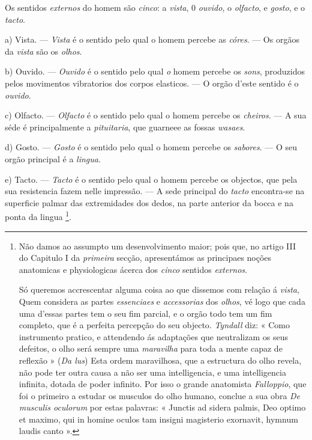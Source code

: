  
Os sentidos \emph{externos} do homem são \emph{cinco}: a \emph{vista}, 0 \emph{ouvido}, o \emph{olfacto}, e \emph{gosto}, e o \emph{tacto}.

a) Vista. --- \emph{Vista} é o sentido pelo qual o homem percebe as \emph{córes}. --- Os orgãos da \emph{vista} são os \emph{olhos}.

b) Ouvido. --- \emph{Ouvido} é o sentido pelo qual \emph{o} homem percebe os \emph{sons}, produzidos pelos movimentos vibratorios dos corpos elasticos. --- O orgão d'este sentido é o \emph{ouvido}.

c) Olfacto. --- \emph{Olfacto} é o sentido pelo qual o homem percebe os \emph{cheiros}. --- A sua séde é principalmente a \emph{pituitaria}, que guarneee as fossas \emph{wasaes}.

d) Gosto. --- \emph{Gosto} é o sentido pelo qual o homem percebe os \emph{sabores}. --- O seu orgão principal é a \emph{lingua}.

e) Tacto. --- \emph{Tacto} é o sentido pelo qual o homem percebe os objectos, que pela sua resistencia fazem nelle impressão. --- A sede principal do \emph{tacto} encontra-se na superficie palmar das extremidades dos dedos, na parte anterior da bocca e na ponta da lingua \footnote{Não damos ao assumpto um desenvolvimento maior; pois que, no artigo III do Capitulo I da \emph{primeira} secção, apresentámos as principaes noções anatomicas e physiologicas ácerca dos \emph{cinco} sentidos \emph{externos}.\par Só queremos accrescentar alguma coisa ao que dissemos com relação á \emph{vista}, Quem considera as partes \emph{essenciaes} e \emph{accessorias} dos \emph{olhos}, vé logo que cada uma d'essas partes tem o seu fim parcial, e o orgão todo tem um fim completo, que é a perfeita percepção do seu objecto. \emph{Tyndall} diz: « Como instrumento pratico, e attendendo ás adaptações que neutralizam os seus defeitos, o olho será sempre uma \emph{maravilha} para toda a mente capaz de reflexão » (\emph{Da lus}) Esta ordem maravilhosa, que a estructura do olho revela, não pode ter outra causa a não ser uma intelligencia, e uma intelligencia infinita, dotada de poder infinito. Por isso o grande anatomista\textbar{} \emph{Falloppio}, que foi o primeiro a estudar os musculos do olho humano, conclue a sua obra \emph{De musculis oculorum} por estas palavras: « Junctis ad sidera palmis, Deo optimo et maximo, qui in homine oculos tam insigni magisterio exornavit, hymnum laudis canto ».}.

